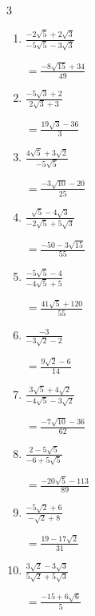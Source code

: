 \begin{multicols}{3}
\begin{enumerate}
        $\displaystyle =\frac{-10-2\sqrt{5}}{25}$

\columnbreak %

  \item $\displaystyle \frac{-2\sqrt{5}+2\sqrt{3}}{-5\sqrt{5}-3\sqrt{3}}$

        $\displaystyle =\frac{-8\sqrt{15}+34}{49}$

  \item $\displaystyle \frac{-5\sqrt{3}+2}{2\sqrt{3}+3}$

        $\displaystyle =\frac{19\sqrt{3}-36}{3}$

  \item $\displaystyle \frac{4\sqrt{5}+3\sqrt{2}}{-5\sqrt{5}}$

        $\displaystyle =\frac{-3\sqrt{10}-20}{25}$

  \item $\displaystyle \frac{\sqrt{5}-4\sqrt{3}}{-2\sqrt{5}+5\sqrt{3}}$

        $\displaystyle =\frac{-50-3\sqrt{15}}{55}$

  \item $\displaystyle \frac{-5\sqrt{5}-4}{-4\sqrt{5}+5}$

        $\displaystyle =\frac{41\sqrt{5}+120}{55}$

\columnbreak %

  \item $\displaystyle \frac{-3}{-3\sqrt{2}-2}$

        $\displaystyle =\frac{9\sqrt{2}-6}{14}$

  \item $\displaystyle \frac{3\sqrt{5}+4\sqrt{2}}{-4\sqrt{5}-3\sqrt{2}}$

        $\displaystyle =\frac{-7\sqrt{10}-36}{62}$

  \item $\displaystyle \frac{2-5\sqrt{5}}{-6+5\sqrt{5}}$

        $\displaystyle =\frac{-20\sqrt{5}-113}{89}$

  \item $\displaystyle \frac{-5\sqrt{2}+6}{-\sqrt{2}+8}$

        $\displaystyle =\frac{19-17\sqrt{2}}{31}$

  \item $\displaystyle \frac{3\sqrt{2}-3\sqrt{3}}{5\sqrt{2}+5\sqrt{3}}$

        $\displaystyle =\frac{-15+6\sqrt{6}}{5}$

\columnbreak %


\end{enumerate}
\end{multicols}
